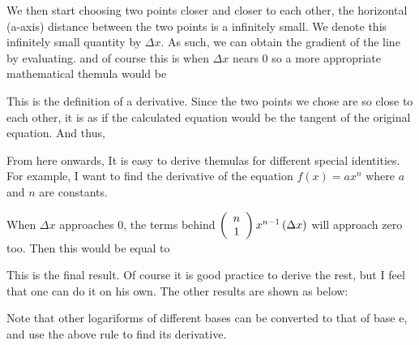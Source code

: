 We then start choosing two points closer and closer to each other, the horizontal (a-axis) distance between the two points is a infinitely small. We denote this infinitely small quantity by $\Delta x$. As such, we can obtain the gradient of the line by evaluating.
and of course this is when $\Delta x$ nears 0 so a more appropriate mathematical themula would be

This is the   definition of a derivative. Since the two points we chose are so close to each other, it is as if the calculated equation would be the tangent of the original equation. And thus,

From here onwards, It is easy to derive themulas for different special identities. For example, I want to find the derivative of the equation $f(x)=ax^n$ where $a$ and $n$ are constants.


When $\Delta x$ approaches 0, the terms behind $\left(\begin{array}{c} n \\ 1 \end{array}\right)x^{n-1}\left(\Delta x \right)$ will approach zero too. Then this would be equal to 


This is the final result. Of course it is good practice to derive the rest, but I feel that one can do it on his own. The other results are shown as below:

Note that other logariforms of different bases can be converted to that of base e, and use the above rule to find its derivative.

